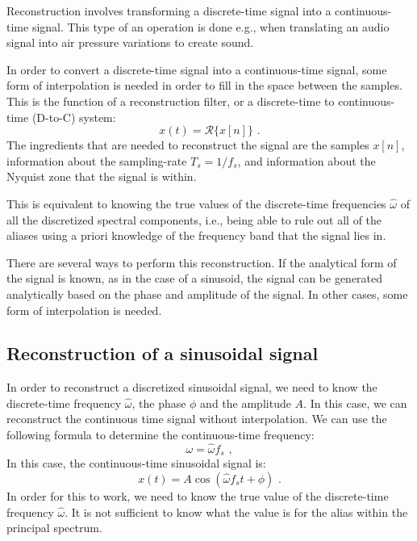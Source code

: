 Reconstruction involves transforming a discrete-time signal into a continuous-time signal. This type of an operation is done e.g., when translating an audio signal into air pressure variations to create sound.

In order to convert a discrete-time signal into a continuous-time signal, some form of interpolation is needed in order to fill in the space between the samples. This is the function of a reconstruction filter, or a discrete-time to continuous-time (D-to-C) system:
\begin{equation}
x(t) = \mathcal{R}\{x[n]\}\,\,.
\end{equation}
The ingredients that are needed to reconstruct the signal are the samples $x[n]$, information about the sampling-rate $T_s=1/f_s$, and information about the Nyquist zone that the signal is within.

This is equivalent to knowing the true values of the discrete-time frequencies $\hat{\omega}$ of all the discretized spectral components, i.e., being able to rule out all of the aliases using a priori knowledge of the frequency band that the signal lies in. 

There are several ways to perform this reconstruction. If the analytical form of the signal is known, as in the case of a sinusoid, the signal can be generated analytically based on the phase and amplitude of the signal. In other cases, some form of interpolation is needed.

\subsection{Reconstruction of a sinusoidal signal}
In order to reconstruct a discretized sinusoidal signal, we need to
know the discrete-time frequency $\hat{\omega}$, the phase $\phi$ and the amplitude $A$. In this case, we can reconstruct the continuous time signal without interpolation. We can use the following formula to determine the continuous-time frequency:
\begin{equation}
\omega = \hat{\omega} f_s\,\,,
\end{equation}
In this case, the continuous-time sinusoidal signal is:
\begin{equation}
x(t)=A\cos(\hat{\omega}f_s t+\phi)\,\,.
\end{equation}
In order for this to work, we need to know the true value of the discrete-time frequency $\hat{\omega}$. It is not sufficient to know what the value is for the alias within the principal spectrum.
\fi

